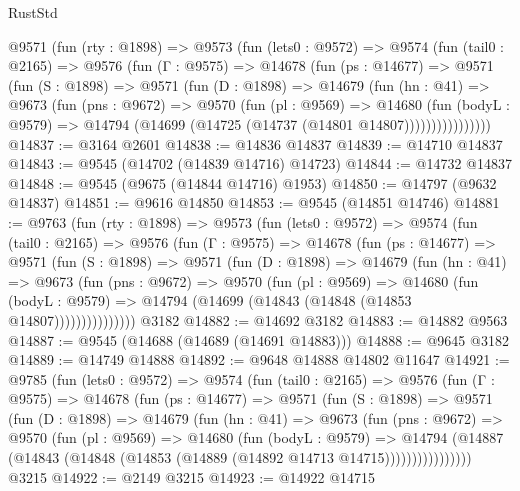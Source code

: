 \begin{lexlean}{RustStd}
\begin{coremodule}
    @9571
      (fun (rty : @1898) =>
      @9573
        (fun (lets0 : @9572) =>
        @9574
          (fun (tail0 : @2165) =>
          @9576
            (fun (Γ : @9575) =>
            @14678
              (fun (ps : @14677) =>
              @9571
                (fun (S : @1898) =>
                @9571
                  (fun (D : @1898) =>
                  @14679
                    (fun (hn : @41) =>
                    @9673
                      (fun (pns : @9672) =>
                      @9570
                        (fun (pl : @9569) =>
                        @14680
                          (fun (bodyL : @9579) =>
                          @14794 (@14699 (@14725 (@14737 (@14801 @14807))))))))))))))))
@14837 := @3164 @2601
@14838 := @14836 @14837
@14839 := @14710 @14837
@14843 := @9545 (@14702 (@14839 @14716) @14723)
@14844 := @14732 @14837
@14848 := @9545 (@9675 (@14844 @14716) @1953)
@14850 := @14797 (@9632 @14837)
@14851 := @9616 @14850
@14853 := @9545 (@14851 @14746)
@14881 := @9763
    (fun (rty : @1898) =>
    @9573
      (fun (lets0 : @9572) =>
      @9574
        (fun (tail0 : @2165) =>
        @9576
          (fun (Γ : @9575) =>
          @14678
            (fun (ps : @14677) =>
            @9571
              (fun (S : @1898) =>
              @9571
                (fun (D : @1898) =>
                @14679
                  (fun (hn : @41) =>
                  @9673
                    (fun (pns : @9672) =>
                    @9570
                      (fun (pl : @9569) =>
                      @14680
                        (fun (bodyL : @9579) =>
                        @14794 (@14699 (@14843 (@14848 (@14853 @14807)))))))))))))))
    @3182
@14882 := @14692 @3182
@14883 := @14882 @9563
@14887 := @9545 (@14688 (@14689 (@14691 @14883)))
@14888 := @9645 @3182
@14889 := @14749 @14888
@14892 := @9648 @14888 @14802 @11647
@14921 := @9785
    (fun (lets0 : @9572) =>
    @9574
      (fun (tail0 : @2165) =>
      @9576
        (fun (Γ : @9575) =>
        @14678
          (fun (ps : @14677) =>
          @9571
            (fun (S : @1898) =>
            @9571
              (fun (D : @1898) =>
              @14679
                (fun (hn : @41) =>
                @9673
                  (fun (pns : @9672) =>
                  @9570
                    (fun (pl : @9569) =>
                    @14680
                      (fun (bodyL : @9579) =>
                      @14794
                        (@14887
                          (@14843 (@14848 (@14853 (@14889 (@14892 @14713 @14715))))))))))))))))
    @3215
@14922 := @2149 @3215
@14923 := @14922 @14715

\end{coremodule}
\end{lexlean}
